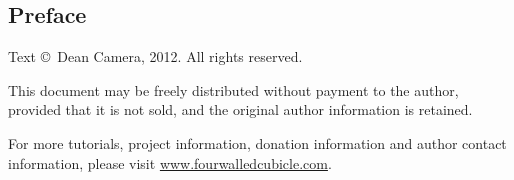 \subsection*{Preface}

Text \copyright \ Dean Camera, 2012. All rights reserved.

This document may be freely distributed without payment to the author, provided that it is not sold, and the original author information is retained.

For more tutorials, project information, donation information and author contact information, please visit \href{http://www.fourwalledcubicle.com}{www.fourwalledcubicle.com}.

\cleardoublepage

